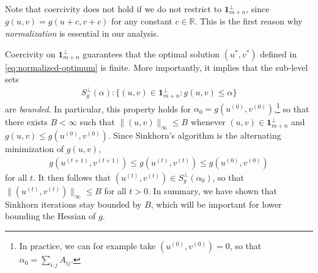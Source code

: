 
 Note that coercivity does not hold if we do not restrict to $\mathbf{1}_{m+n}^\perp$, since $g(u,v)=g(u+c,v+c)$ for any constant $c\in\mathbb{R}$. This is the first reason why \emph{normalization} is essential in our analysis.
 
 Coercivity on $\mathbf{1}_{m+n}^\perp$ guarantees that the optimal solution $(u^\ast,v^\ast)$ defined in \eqref{eq:normalized-optimum} is finite. More importantly, it implies that the sub-level sets
 \begin{align*}
   S_g^\perp(\alpha):  \{(u,v)\in \mathbf{1}_{m+n}^\perp:g(u,v)\leq \alpha \}
 \end{align*}
 are \emph{bounded}. In particular, this property holds for $\alpha_0=g(u^{(0)},v^{(0)})$,\footnote{In practice, we can for example take $(u^{(0)},v^{(0)})=0$, so that $\alpha_0=\sum_{i,j}A_{ij}$.} so that there exists $B<\infty$ such that $\|(u,v)\|_{\infty}\leq B$ whenever $(u,v)\in \mathbf{1}_{m+n}^\perp$ and  $g(u,v)\leq g(u^{(0)},v^{(0)})$. Since Sinkhorn's algorithm is the alternating minimization
of $g(u,v)$,
\begin{align*}
    g(u^{(t+1)},v^{(t+1)})\leq g(u^{(t)},v^{(t)})\leq g(u^{(0)},v^{(0)})
\end{align*}
for all $t$. It then follows that $(u^{(t)},v^{(t)}) \in S_g^\perp(\alpha_0)$, so that $\|(u^{(t)},v^{(t)})\|_{\infty}\leq B$ for
all $t>0$. In summary, we have shown that Sinkhorn iterations stay bounded by $B$, which will be important for lower bounding the Hessian of $g$. 

